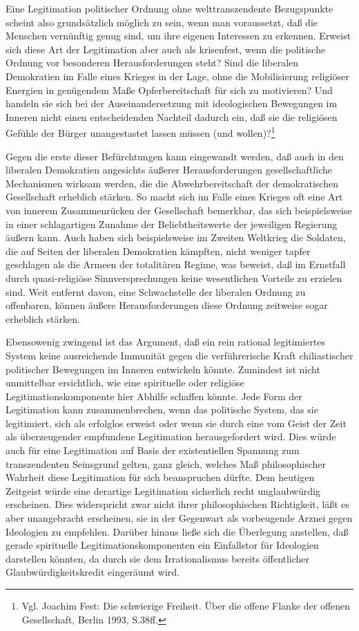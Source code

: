 Eine Legitimation politischer Ordnung ohne welttranszendente Bezugspunkte
scheint also grundsätzlich möglich zu sein, wenn man voraussetzt, daß die
Menschen vernünftig genug sind, um ihre eigenen Interessen zu erkennen.
Erweist sich diese Art der Legitimation aber auch als krisenfest, wenn die
politische Ordnung vor besonderen Herausforderungen steht? Sind die liberalen
Demokratien im Falle eines Krieges in der Lage, ohne die Mobilisierung
religiöser Energien in genügendem Maße Opferbereitschaft für sich zu
motivieren? Und handeln sie sich bei der Auseinandersetzung mit ideologischen
Bewegungen im Inneren nicht einen entscheidenden Nachteil dadurch ein, daß sie
die religiösen Gefühle der Bürger unangestastet lassen müssen (und
wollen)?\footnote{Vgl. Joachim Fest: Die schwierige Freiheit. Über die offene
  Flanke der offenen Gesellschaft, Berlin 1993, S.38ff.}

Gegen die erste dieser Befürchtungen kann eingewandt werden, daß auch in den
liberalen Demokratien angesichts äußerer Herausforderungen gesellschaftliche
Mechanismen wirksam werden, die die Abwehrbereitschaft der demokratischen
Gesellschaft erheblich stärken. So macht sich im Falle eines Krieges oft eine
Art von innerem Zusammenrücken der Gesellschaft bemerkbar, das sich
beispielsweise in einer schlagartigen Zunahme der Beliebtheitswerte der
jeweiligen Regierung äußern kann. Auch haben sich beispielsweise im Zweiten
Weltkrieg die Soldaten, die auf Seiten der liberalen Demokratien kämpften,
nicht weniger tapfer geschlagen als die Armeen der totalitären Regime, was
beweist, daß im Ernstfall durch quasi-religiöse Sinnversprechungen keine
wesentlichen Vorteile zu erzielen sind. Weit entfernt davon, eine
Schwachstelle der liberalen Ordnung zu offenbaren, können äußere
Herausforderungen diese Ordnung zeitweise sogar erheblich stärken.

Ebensowenig zwingend ist das Argument, daß ein rein rational legitimiertes
System keine ausreichende Immunität gegen die verführerische Kraft
chiliastischer politischer Bewegungen im Inneren entwickeln könnte.  Zumindest
ist nicht unmittelbar ersichtlich, wie eine spirituelle oder religiöse
Legitimationskomponente hier Abhilfe schaffen könnte. Jede Form der
Legitimation kann zusammenbrechen, wenn das politische System, das sie
legitimiert, sich als erfolglos erweist oder wenn sie durch eine vom Geist der
Zeit als überzeugender empfundene Legitimation herausgefordert wird. Dies
würde auch für eine Legitimation auf Basis der existentiellen Spannung zum
transzendenten Seinsgrund gelten, ganz gleich, welches Maß philosophischer
Wahrheit diese Legitimation für sich beanspruchen dürfte. Dem heutigen
Zeitgeist würde eine derartige Legitimation sicherlich recht unglaubwürdig
erscheinen. Dies widerspricht zwar nicht ihrer philosophischen Richtigkeit,
läßt es aber unangebracht erscheinen, sie in der Gegenwart als vorbeugende
Arznei gegen Ideologien zu empfehlen. Darüber hinaus ließe sich die Überlegung
anstellen, daß gerade spirituelle Legitimationskomponenten ein Einfallstor für
Ideologien darstellen könnten, da durch sie dem Irrationalismus bereits
öffentlicher Glaubwürdigkeitskredit eingeräumt wird.

